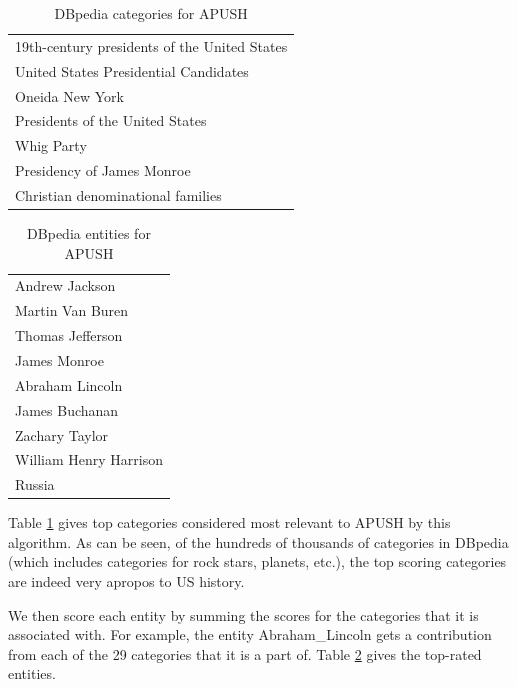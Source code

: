 \documentclass[pdfpagelabels=false,plainpages=true]{acm_proc_article-sp}
\begin{document}
\begin{table}
\begin{center}
\begin{tabular}{|l|} \hline
19th-century presidents of the United States \\
United States Presidential Candidates \\
Oneida New York \\
Presidents of the United States \\
Whig Party \\
Presidency of James Monroe \\
Christian denominational families \\
\hline \end{tabular}
\caption{DBpedia categories for APUSH}
\label{tab-categories}
\end{center}
\end{table}

\begin{table}
\begin{center}
\begin{tabular}{|l|} \hline
Andrew Jackson \\
Martin Van Buren \\
Thomas Jefferson \\
James Monroe \\
Abraham Lincoln \\
James Buchanan \\
Zachary Taylor \\
William Henry Harrison \\
Russia \\
\hline\end{tabular}
\caption{DBpedia entities for APUSH}
\label{tab-entities}
\end{center}
\end{table}

Table \ref{tab-categories} gives top categories considered most relevant to
APUSH by this algorithm. As can be seen, of the hundreds of thousands of
categories in DBpedia (which includes categories for rock stars, planets, etc.), the
top scoring categories are indeed very apropos to US history.           


We then score each entity by summing the scores for the categories that it is
associated with. For example, the entity Abraham\_Lincoln gets a contribution
from each of the 29 categories that it is a part of. Table \ref{tab-entities}
gives the top-rated entities. 
\end{document}
